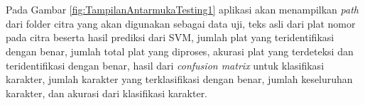 \begin{adjustbox}{width=1\textwidth}
	\noindent\begin{minipage}{\linewidth}
		\centering{}
		\label{fig:TampilanAntarmukaTesting3}
	\end{minipage}
\end{adjustbox}\\
\\
\noindent Pada Gambar \ref{fig:TampilanAntarmukaTesting1} aplikasi akan menampilkan \textit{path} dari folder citra yang akan digunakan sebagai data uji, teks asli dari plat nomor pada citra beserta hasil prediksi dari SVM, jumlah plat yang teridentifikasi dengan benar, jumlah total plat yang diproses, akurasi plat yang terdeteksi dan teridentifikasi dengan benar, hasil dari \textit{confusion matrix} untuk klasifikasi karakter, jumlah karakter yang terklasifikasi dengan benar, jumlah keseluruhan karakter, dan akurasi dari klasifikasi karakter.\\

